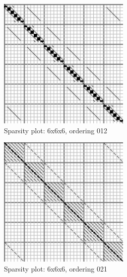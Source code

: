 \documentclass[10pt]{article}
\begin{document}
\begin{multicols}{2}
\newcommand{\spwidth}{2.5in}
\begin{figure}[H]
	\centering
	\includegraphics[width=\spwidth]{../img/sparsity/int_hq_6x6x6_012.png}
	\caption{Sparsity plot: 6x6x6, ordering 012 }
\end{figure}

\begin{figure}[H]
	\centering
	\includegraphics[width=\spwidth]{../img/sparsity/int_hq_6x6x6_021.png}
	\caption{Sparsity plot: 6x6x6, ordering 021 }
\end{figure}


\end{multicols}
\end{document}
